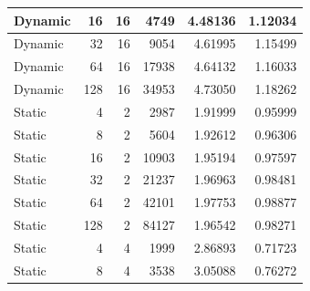 \documentclass[journal,transmag]{IEEEtran}
\begin{document}
\begin{table}[h!]
\begin{tabular}{|l|r|r|r|r|r|}
		Dynamic       & 16                           & 16                           & 4749                              & 4.48136                       & 1.12034                         \\ \hline
		Dynamic       & 32                           & 16                           & 9054                              & 4.61995                       & 1.15499                         \\ \hline
		Dynamic       & 64                           & 16                           & 17938                             & 4.64132                       & 1.16033                         \\ \hline
		Dynamic       & 128                          & 16                           & 34953                             & 4.73050                       & 1.18262                         \\ \hline
		Static        & 4                            & 2                            & 2987                              & 1.91999                       & 0.95999                         \\ \hline
		Static        & 8                            & 2                            & 5604                              & 1.92612                       & 0.96306                         \\ \hline
		Static        & 16                           & 2                            & 10903                             & 1.95194                       & 0.97597                         \\ \hline
		Static        & 32                           & 2                            & 21237                             & 1.96963                       & 0.98481                         \\ \hline
		Static        & 64                           & 2                            & 42101                             & 1.97753                       & 0.98877                         \\ \hline
		Static        & 128                          & 2                            & 84127                             & 1.96542                       & 0.98271                         \\ \hline
		Static        & 4                            & 4                            & 1999                              & 2.86893                       & 0.71723                         \\ \hline
		Static        & 8                            & 4                            & 3538                              & 3.05088                       & 0.76272                         \\ \hline

\end{tabular}
\end{table}
\end{document}
